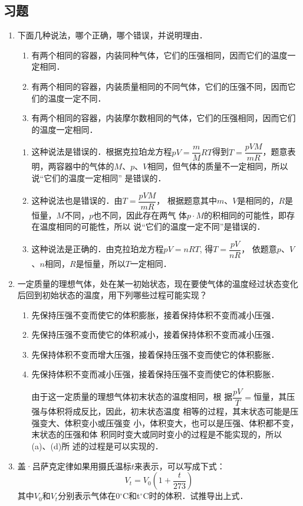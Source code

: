 \subsection{习题}
\begin{enumerate}
	\item 下面几种说法，哪个正确，哪个错误，并说明理由．
	\begin{enumerate}
		\item 有两个相同的容器，内装同种气体，它们的压强相同，因而它们的温度一定相同．
		\item 有两个相同的容器，内装质量相同的不同气体，它们的压强不同，因而它们的温度一定不同．
		\item 有两个相同的容器，内装摩尔数相同的气体，它们的压强相同，因而它们的温度一定相同．
	\end{enumerate}

\begin{solution}
\begin{enumerate}
    \item 这种说法是错误的．根据克拉珀龙方程$pV=\dfrac{m}{M}RT$得到$T=\dfrac{pVM}{mR}$，题意表明，两容器中的气体的$M$、$p$、$V$相同，但气体的质量不一定相同，所以说“它们的温度一定相同”
    是错误的．
    \item 这种说法也是错误的．由$T=\dfrac{pVM}{mR}$，
    根据题意其中$m$、$V$是相同的，$R$是恒量，$M$不同，$p$也不同，因此存在两气
    体$p\cdot M$的积相同的可能性，即存在温度相同的可能性，所以
    说“它们的温度一定不同”是错误的．
    \item 这种说法是正确的．由克拉珀龙方程$pV=nRT$, 得$T=\dfrac{pV}{nR}$，
    依题意$p$、$V$、$n$相同，$R$是恒量，所以$T$一定相同．
\end{enumerate}
\end{solution}
\item 一定质量的理想气体，处在某一初始状态，现在要使气体的温度经过状态变化后回到初始状态的温度，用下列哪些过程可能实现？
\begin{enumerate}
	\item 先保持压强不变而使它的体积膨胀，接着保持体积不变而减小压强．
\item 先保持压强不变而使它的体积减小，接着保持体积不变而减小压强．
\item 先保持体积不变而增大压强，接着保持压强不变而使它的体积膨胀．
\item 先保持体积不变而减小压强，接着保持压强不变而使它的体积膨胀．	 

\begin{solution}
    由于这一定质量的理想气体初末状态的温度相同，根
    据$\dfrac{pV}{T}=$恒量，其压强与体积将成反比，因此，初末状态温度
    相等的过程，其末状态可能是压强变大、体积变小或压强变
小，体积变大，也可以是压强、体积都不变，末状态的压强和体
积同时变大或同时变小的过程是不能实现的，所以(a)、(d)所
述的过程是可以实现的．
\end{solution}
\end{enumerate}
\item 盖·吕萨克定律如果用摄氏温标$t$来表示，可以写成下式：
\[V_t=V_0\left(1+\frac{t}{273}\right) \]
其中$V_0$和$V_t$分别表示气体在0$^\circ$C和t$^\circ$C时的体积．试推导出上式．


\end{enumerate}
